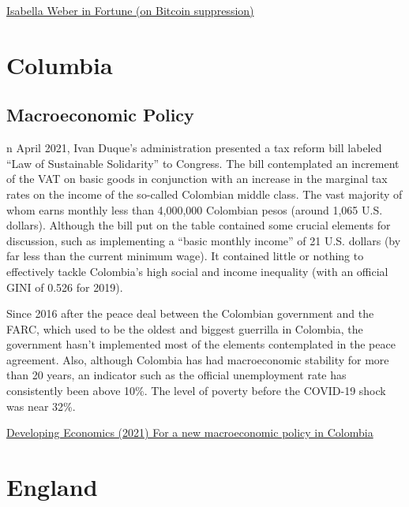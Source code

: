 \documentclass[
]{book}
\begin{document}
\href{https://fortune.com/2021/05/21/china-ban-bitcoin-price-bubble-crypto/}{Isabella Weber in Fortune (on Bitcoin suppression)}

\hypertarget{columbia}{%
\chapter{Columbia}\label{columbia}}

\hypertarget{macroeconomic-policy}{%
\section{Macroeconomic Policy}\label{macroeconomic-policy}}

n April 2021, Ivan Duque's administration presented a tax reform bill labeled ``Law of Sustainable Solidarity'' to Congress. The bill contemplated an increment of the VAT on basic goods in conjunction with an increase in the marginal tax rates on the income of the so-called Colombian middle class. The vast majority of whom earns monthly less than 4,000,000 Colombian pesos (around 1,065 U.S. dollars). Although the bill put on the table contained some crucial elements for discussion, such as implementing a ``basic monthly income'' of 21 U.S. dollars (by far less than the current minimum wage). It contained little or nothing to effectively tackle Colombia's high social and income inequality (with an official GINI of 0.526 for 2019).

Since 2016 after the peace deal between the Colombian government and the FARC, which used to be the oldest and biggest guerrilla in Colombia, the government hasn't implemented most of the elements contemplated in the peace agreement. Also, although Colombia has had macroeconomic stability for more than 20 years, an indicator such as the official unemployment rate has consistently been above 10\%. The level of poverty before the COVID-19 shock was near 32\%.

\href{https://developingeconomics.org/2021/05/21/for-a-new-macroeconomic-policy-in-colombia/}{Developing Economics (2021) For a new macroeconomic policy in Colombia}

\hypertarget{england}{%
\chapter{England}\label{england}}
\end{document}
